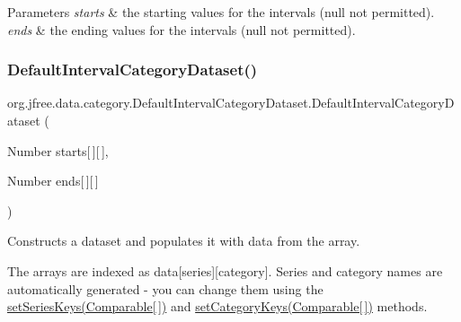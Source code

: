 \begin{DoxyParams}{Parameters}
{\em starts} & the starting values for the intervals ({\ttfamily null} not permitted). \\
\hline
{\em ends} & the ending values for the intervals ({\ttfamily null} not permitted). \\
\hline
\end{DoxyParams}
\mbox{\label{classorg_1_1jfree_1_1data_1_1category_1_1_default_interval_category_dataset_aa00fee2391edf2649fc2427c3f896d45}} 
\subsubsection{\texorpdfstring{Default\+Interval\+Category\+Dataset()}{DefaultIntervalCategoryDataset()}\hspace{0.1cm}{\footnotesize\ttfamily [2/4]}}
{\footnotesize\ttfamily org.\+jfree.\+data.\+category.\+Default\+Interval\+Category\+Dataset.\+Default\+Interval\+Category\+Dataset (\begin{DoxyParamCaption}\item[{Number}]{starts\mbox{[}$\,$\mbox{]}\mbox{[}$\,$\mbox{]},  }\item[{Number}]{ends\mbox{[}$\,$\mbox{]}\mbox{[}$\,$\mbox{]} }\end{DoxyParamCaption})}

Constructs a dataset and populates it with data from the array. 

The arrays are indexed as data\mbox{[}series\mbox{]}\mbox{[}category\mbox{]}. Series and category names are automatically generated -\/ you can change them using the \mbox{\hyperlink{}{set\+Series\+Keys(\+Comparable\mbox{[}$\,$\mbox{]})}} and \mbox{\hyperlink{}{set\+Category\+Keys(\+Comparable\mbox{[}$\,$\mbox{]})}} methods.


